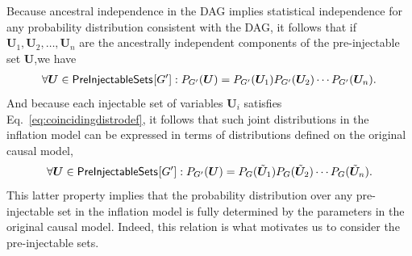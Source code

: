 Because ancestral independence in the DAG implies statistical independence for any probability distribution consistent with the DAG, it follows that  if $\bm{U}_1,\bm{U}_2,\ldots,\bm{U}_n$ are the ancestrally independent components of the pre-injectable set $\bm{U}$,we have
\begin{align}\label{eq:preinjfactor}
\forall \bm{U}\in\SmallNamedFunction{PreInjectableSets}{G'}:	\pdf[G']{\bm{U}} = \pdf[G']{\bm{U}_1} \pdf[G']{\bm{U}_2}  \cdots \pdf[G']{\bm{U}_n}.
\end{align}
And because each injectable set of variables $\bm{U}_i$ satisfies Eq.~\eqref{eq:coincidingdistrodef}, it follows that such joint distributions in the inflation model can be expressed in terms of distributions defined on the original causal model,
\begin{align}\label{eq:preinjfactor}
\forall \bm{U}\in\SmallNamedFunction{PreInjectableSets}{G'}:	\pdf[G']{\bm{U}} = \pdf[G]{\subsim{\bm{U}}_1} \pdf[G]{\subsim{\bm{U}}_2}  \cdots \pdf[G]{\subsim{\bm{U}}_n}.
\end{align}
This latter property implies that the probability distribution over any pre-injectable set in the inflation model is fully determined by the parameters in the original causal model.  Indeed, this relation is what motivates us to consider the pre-injectable sets.

